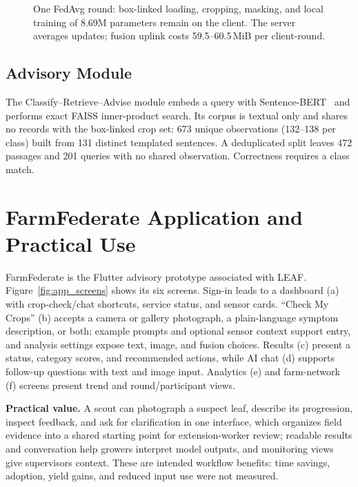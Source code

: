 \documentclass[conference]{IEEEtran}
\begin{document}
\begin{figure}[tbp]
\centering
\resizebox{0.8363\textwidth}{!}{}
\caption{One FedAvg round: box-linked loading, cropping, masking, and local training of 8.69M parameters remain on the client. The server averages updates; fusion uplink costs 59.5--60.5\,MiB per client-round.}
\label{fig:edge_cloud}
\end{figure}



\subsection{Advisory Module}
\label{sec:rag}

The Classify--Retrieve--Advise module embeds a query with
Sentence-BERT~\cite{Reimers2019} and performs exact FAISS inner-product
search. Its corpus is textual only and shares no
records with the box-linked crop set: 673 unique observations (132--138 per class)
built from 131 distinct templated sentences. A deduplicated split leaves 472
passages and 201 queries with no shared observation. Correctness requires a class
match.

\section{FarmFederate Application and Practical Use}
\label{sec:app}

FarmFederate is the Flutter advisory prototype associated with LEAF.
Figure~\ref{fig:app_screens} shows its six screens. Sign-in leads to a
dashboard (a) with crop-check/chat shortcuts, service status, and sensor cards.
``Check My Crops'' (b) accepts a camera or gallery photograph, a plain-language
symptom description, or both; example prompts and optional sensor context
support entry, and analysis settings expose text, image, and fusion choices.
Results (c) present a status, category scores, and recommended actions, while
AI chat (d) supports follow-up questions with text and image input. Analytics
(e) and farm-network (f) screens present trend and round/participant views.

\textbf{Practical value.} A scout can photograph a suspect leaf, describe its
progression, inspect feedback, and ask for clarification in one interface,
which organizes field evidence into a shared starting point for
extension-worker review; readable results and conversation help growers
interpret model outputs, and monitoring views give supervisors context. These
are intended workflow benefits: time savings, adoption, yield gains, and
reduced input use were not measured.
\end{document}
